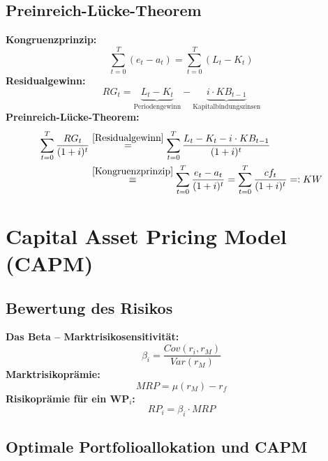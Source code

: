 \documentclass[leqno]{scrartcl}
\begin{document}
\begin{multicols}{4}
\subsection{Preinreich-Lücke-Theorem}

\textbf{Kongruenzprinzip:}
  \begin{equation*}\label{Kongruenzprinzip}
    \sum^{T}_{t=0} (e_t-a_t) = \sum^{T}_{t=0} (L_t-K_t)
  \end{equation*}
\textbf{Residualgewinn:}
  \begin{equation*}\label{Residualgewinn}
    RG_t=\underbrace{L_t-K_t}_\text{Periodengewinn}-\underbrace{i \cdot KB_{t-1}}_\text{Kapitalbindungszinsen}
  \end{equation*}
\textbf{Preinreich-Lücke-Theorem:}
  \begin{equation*}
    \begin{split}
      \sum^{T}_{t=0} \frac{RG_t}{(1+i)^t} 
        &\overset{\ref{Residualgewinn}}{=} \sum^{T}_{t=0} \frac{L_t - K_t - i \cdot KB_{t-1}}{(1+i)^t}\\
        &\overset{\ref{Kongruenzprinzip}}{\equiv} \sum^{T}_{t=0} \frac{e_t - a_t}{(1+i)^t}
        = \sum^{T}_{t=0} \frac{cf_t}{(1+i)^t}
        =: KW
    \end{split}
  \end{equation*}

\section{Capital Asset Pricing Model (CAPM)}

\subsection{Bewertung des Risikos}
  \textbf{Das Beta – Marktrisikosensitivität:}
    \begin{equation*}
      \beta_i = \frac{Cov(r_i ,r_M)}{Var(r_M)}
    \end{equation*}
  \textbf{Marktrisikoprämie:}
    \begin{equation*}
      MRP = \mu(r_M) -r_f
    \end{equation*}
  \textbf{Risikoprämie für ein WP$_i$:}
    \begin{equation*}
      RP_i = \beta_i \cdot MRP
    \end{equation*}

\subsection{Optimale Portfolioallokation und CAPM}


\end{multicols}
\end{document}
